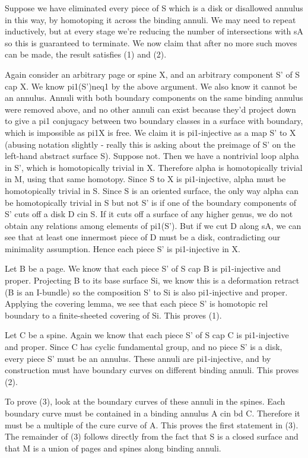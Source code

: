 Suppose we have eliminated every piece of S which is a disk or disallowed
annulus in this way, by homotoping it across the binding annuli. We may need to
repeat inductively, but at every stage we're reducing the number of
intersections with sA so this is guaranteed to terminate. We now claim that
after no more such moves can be made, the result satisfies (1) and (2).

Again consider an arbitrary page or spine X, and an arbitrary component S' of
S cap X.  We know pi1(S')neq1 by the above argument. We also know it cannot be
an annulus. Annuli with both boundary components on the same binding annulus
were removed above, and no other annuli can exist because they'd project down
to give a pi1 conjugacy between two boundary classes in a surface with
boundary, which is impossible as pi1X is free. We claim it is pi1-injective as
a map S' to X (abusing notation slightly - really this is asking about the
preimage of S' on the left-hand abstract surface S).  Suppose not. Then we have
a nontrivial loop alpha in S', which is homotopically trivial in X.  Therefore
alpha is homotopically trivial in M, using that same homotopy.  Since S to X is
pi1-injective, alpha must be homotopically trivial in S. Since S is an oriented
surface, the only way alpha can be homotopically trivial in S but not S' is if
one of the boundary components of S' cuts off a disk D cin S. If it cuts off
a surface of any higher genus, we do not obtain any relations among elements of
pi1(S'). But if we cut D along sA, we can see that at least one innermost piece
of D must be a disk, contradicting our minimality assumption. Hence each piece
S' is pi1-injective in X.

Let B be a page. We know that each piece S' of S cap B is pi1-injective and
proper. Projecting B to its base surface Si, we know this is a deformation
retract (B is an I-bundle) so the composition S' to Si is also pi1-injective
and proper. Applying the covering lemma, we see that each piece S' is homotopic
rel boundary to a finite-sheeted covering of Si. This proves (1).

Let C be a spine. Again we know that each piece S' of S cap C is pi1-injective
and proper. Since C has cyclic fundamental group, and no piece S' is a disk,
every piece S' must be an annulus. These annuli are pi1-injective, and by
construction must have boundary curves on different binding annuli.  This
proves (2).

To prove (3), look at the boundary curves of these annuli in the spines. Each
boundary curve must be contained in a binding annulus A cin bd C. Therefore it
must be a multiple of the cure curve of A. This proves the first statement in
(3). The remainder of (3) follows directly from the fact that S is a closed
surface and that M is a union of pages and spines along binding annuli.

